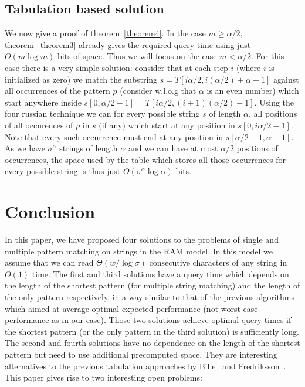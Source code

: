 \documentclass{article}
\newcommand{\?}{\mskip1.5mu}
\begin{document}
\subsection{Tabulation based solution}
We now give a proof of theorem~\ref{theorem4}. In the case $m\geq \alpha/2$, theorem~\ref{theorem3} already gives the required query time using just $O(m\log m)$ bits of space. Thus we will focus on the case $m<\alpha/2$. For this case there is a very simple solution: consider that at each step $i$ (where $i$ is initialized as zero) we match the substring $s=T[i\alpha/2,i(\alpha/2)+\alpha-1]$ against all occurrences of the pattern $p$ (consider w.l.o.g that $\alpha$ is an even number) which start anywhere inside $s[0,\alpha/2-1]=T[i\alpha/2,(i+1)(\alpha/2)-1]$. Using the four russian technique we can for every possible string $s$ of length $\alpha$, all positions of all occurences of $p$ in $s$ (if any) which start at any position in $s[0,i\alpha/2-1]$. Note that every such occurrence must end at any position in $s[\alpha/2-1,\alpha-1]$. As we have $\sigma^\alpha$ strings of length $\alpha$ and we can have at most $\alpha/2$ positions of occurrences, the space used by the table which stores all those occurrences for every possible string is thus just $O(\sigma^\alpha\log\alpha)$ bits. 
\section{Conclusion}
In this paper, we have proposed four solutions to the problems of single and multiple pattern matching on strings in the RAM model. In this model we assume that we can read $\Theta(w/\log\sigma)$ consecutive characters of any string in $O(1)$ time. The first and third solutions have a query time which depends on the length of the shortest pattern (for multiple string matching) and the length of the only pattern respectively, in a way similar to that of the previous algorithms which aimed at average-optimal expected performance (not worst-case performance as in our case). Those two solutions achieve optimal query times if the shortest pattern (or the only pattern in the third solution) is sufficiently long. The second and fourth solutions have no dependence on the length of the shortest pattern but need to use additional precomputed space. They are interesting alternatives to the previous tabulation approaches by Bille~\cite{B09} and Fredriksson~\cite{F02}.
\\




This paper gives rise to two interesting open problems: 
\end{document}
